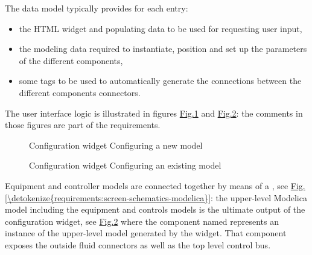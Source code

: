 \documentclass[letterpaper,10pt, openany,english]{sphinxmanual}
\begin{document}
The data model typically provides for each entry:
\begin{itemize}
\item {} 
the HTML widget and populating data to be used for requesting user input,

\item {} 
the modeling data required to instantiate, position and set up the parameters of the different components,

\item {} 
some tags to be used to automatically generate the connections between the different components connectors.

\end{itemize}

The user interface logic is illustrated in figures \hyperref[\detokenize{requirements:screen-conf-0}]{Fig.\@ \ref{\detokenize{requirements:screen-conf-0}}} and \hyperref[\detokenize{requirements:screen-conf-1}]{Fig.\@ \ref{\detokenize{requirements:screen-conf-1}}}: the comments in those figures are part of the requirements.

\begin{figure}[htbp]
\centering
\capstart

\noindent{}
\caption{Configuration widget \textendash{} Configuring a new model}\label{\detokenize{requirements:screen-conf-0}}\end{figure}

\begin{figure}[htbp]
\centering
\capstart

\noindent{}
\caption{Configuration widget \textendash{} Configuring an existing model}\label{\detokenize{requirements:screen-conf-1}}\end{figure}

Equipment and controller models are connected together by means of a , see \hyperref[\detokenize{requirements:screen-schematics-modelica}]{Fig.\@ \ref{\detokenize{requirements:screen-schematics-modelica}}}: the upper-level Modelica model including the equipment and controls models is the ultimate output of the configuration widget, see \hyperref[\detokenize{requirements:screen-conf-1}]{Fig.\@ \ref{\detokenize{requirements:screen-conf-1}}} where the component named  represents an instance of the upper-level model  generated by the widget. That component exposes the outside fluid connectors as well as the top level control bus.
\end{document}
